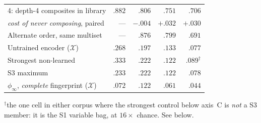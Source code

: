 \begin{center}
\begin{tabular}{@{}l rrrr@{}}
4: depth-4 composites in library & $.882$ & $.806$ & $.751$ & $.706$ \\
\;\emph{cost of never composing}, paired & --- & $-.004$ & $+.032$ & $+.030$ \\
Alternate order, same multiset & --- & $.876$ & $.799$ & $.691$ \\
\midrule
Untrained encoder \;($\mathcal{X}$) & $.268$ & $.197$ & $.133$ & $.077$ \\
Strongest non-learned & $.333$ & $.222$ & $.122$ & $.089^{\dagger}$ \\
S3 maximum & $.233$ & $.222$ & $.122$ & $.078$ \\
$\phi_\infty$, \emph{complete} fingerprint \;($\mathcal{X}$) & $.072$ & $.122$ & $.061$ & $.044$ \\
\bottomrule
\end{tabular}
\end{center}

\noindent$^{\dagger}$the one cell in either corpus where the strongest control below axis~C is \emph{not} a S3 member: it is the S1 variable bag, at $16\times$ chance. See below.

